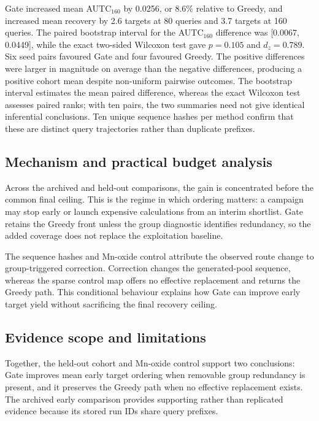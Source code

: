 Gate increased mean AUTC$_{160}$ by 0.0256, or 8.6\% relative to Greedy, and
increased mean recovery by 2.6 targets at 80 queries and 3.7 targets at 160
queries. The paired bootstrap interval for the AUTC$_{160}$ difference was
[0.0067, 0.0449], while the exact two-sided Wilcoxon test gave $p=0.105$ and
$d_z=0.789$. Six seed pairs favoured Gate and four favoured Greedy. The positive
differences were larger in magnitude on average than the negative differences,
producing a positive cohort mean despite non-uniform pairwise outcomes. The
bootstrap interval estimates the mean paired difference, whereas the exact
Wilcoxon test assesses paired ranks; with ten pairs, the two summaries need not
give identical inferential conclusions. Ten unique sequence hashes per method
confirm that these are distinct query trajectories rather than duplicate
prefixes.

\subsection{Mechanism and practical budget analysis}

Across the archived and held-out comparisons, the gain is concentrated before
the common final ceiling. This is the regime in which ordering matters: a
campaign may stop early or launch expensive calculations from an interim
shortlist. Gate retains the Greedy front unless the group diagnostic identifies
redundancy, so the added coverage does not replace the exploitation baseline.

The sequence hashes and Mn-oxide control attribute the observed route change to
group-triggered correction. Correction changes the generated-pool sequence,
whereas the sparse control map offers no effective replacement and returns the
Greedy path. This conditional behaviour explains how Gate can improve early
target yield without sacrificing the final recovery ceiling.

\subsection{Evidence scope and limitations}

Together, the held-out cohort and Mn-oxide control support two conclusions:
Gate improves mean early target ordering when removable group redundancy is
present, and it preserves the Greedy path when no effective replacement exists.
The archived early comparison provides supporting rather than replicated
evidence because its stored run IDs share query prefixes.

